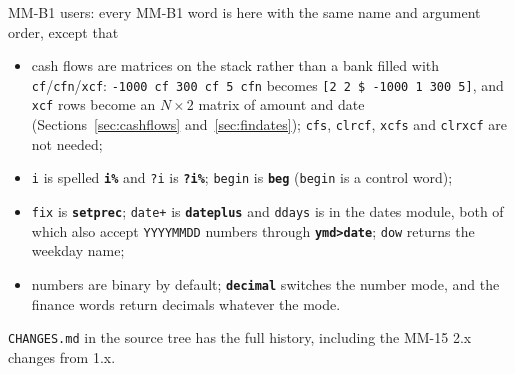 \documentclass[11pt,letterpaper]{article}
\newcommand{\code}[1]{\texttt{#1}}
\newcommand{\cmd}[1]{\texttt{\textbf{#1}}}
\begin{document}
MM-B1 users: every MM-B1 word is here with the same name and argument order, except that
\begin{itemize}
  \item cash flows are matrices on the stack rather than a bank filled with \code{cf}/\code{cfn}/\code{xcf}: \code{-1000 cf 300 cf 5 cfn} becomes \code{[2 2 \$ -1000 1 300 5]}, and \code{xcf} rows become an $N\times 2$ matrix of amount and date (Sections~\ref{sec:cashflows} and~\ref{sec:findates}); \code{cfs}, \code{clrcf}, \code{xcfs} and \code{clrxcf} are not needed;
  \item \code{i} is spelled \cmd{i\%} and \code{?i} is \cmd{?i\%}; \code{begin} is \cmd{beg} (\code{begin} is a control word);
  \item \code{fix} is \cmd{setprec}; \code{date+} is \cmd{dateplus} and \code{ddays} is in the dates module, both of which also accept \code{YYYYMMDD} numbers through \cmd{ymd>date}; \code{dow} returns the weekday name;
  \item numbers are binary by default; \cmd{decimal} switches the number mode, and the finance words return decimals whatever the mode.
\end{itemize}
\code{CHANGES.md} in the source tree has the full history, including the MM-15 2.x changes from 1.x.
\end{document}
